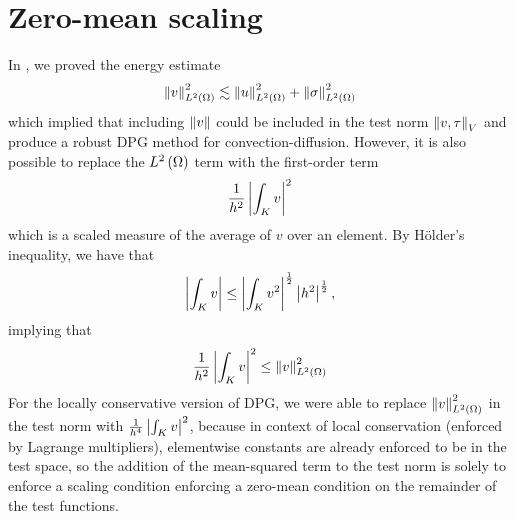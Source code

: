 \section{Zero-mean scaling}

In \cite{DPGrobustness, DPGrobustness2}, we proved the energy estimate
\[
\nor{v}^2_{\L} \lesssim \nor{u}^2_{\L} + \nor{\sigma}^2_{\L}
\]
which implied that including $\nor{v}$ could be included in the test norm $\nor{v,\tau}_V$ and produce a robust DPG method for convection-diffusion.  However, it is also possible to replace the $\L$ term with the first-order term 
\[
\frac{1}{h^2}\LRb{\int_K v}^2
\]
which is a scaled measure of the average of $v$ over an element.  By H\"{o}lder's inequality, we have that 
\[
\LRb{\int_K v} \leq \LRb{\int_K v^2}^{\frac{1}{2}} \LRb{h^2}^{\frac{1}{2}}, 
\]
implying that 
\[
\frac{1}{h^2}\LRb{\int_K v}^2 \leq \nor{v}^2_{\L}
\]
For the locally conservative version of DPG, we were able to replace $\nor{v}^2_{\L}$ in the test norm with $\frac{1}{h^4}\LRb{\int_K v}^2$, because in context of local conservation (enforced by Lagrange multipliers), elementwise constants are already enforced to be in the test space, so the addition of the mean-squared term to the test norm is solely to enforce a scaling condition enforcing a zero-mean condition on the remainder of the test functions.
